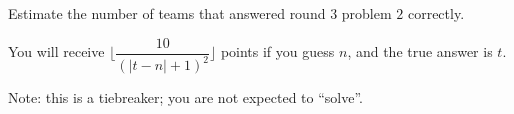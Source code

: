 Estimate the number of teams that answered round $3$ problem $2$ correctly.

You will receive $\lfloor \dfrac{ 10}{ (|t - n| + 1)^2} \rfloor$ points if you guess $n$, and the true answer is $t$.

Note: this is a tiebreaker; you are not expected to ``solve''.
